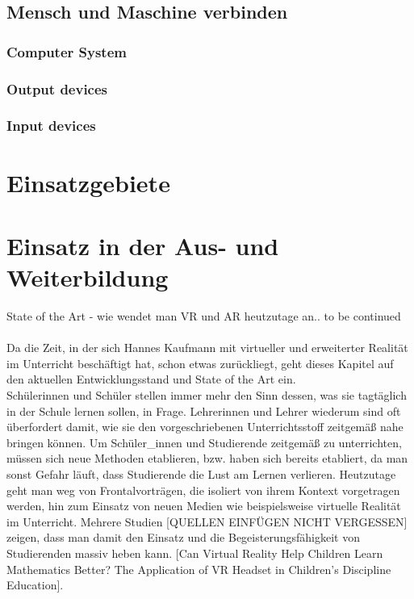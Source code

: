 \documentclass[deutsch]{llncs}
\begin{document}
\subsection{Mensch und Maschine verbinden}

\subsubsection{Computer System}


\subsubsection{Output devices}


\subsubsection{Input devices}


\section{Einsatzgebiete}


\section{Einsatz in der Aus- und Weiterbildung}

State of the Art - wie wendet man VR und AR heutzutage an.. to be continued \\
\noindent \\
Da die Zeit, in der sich Hannes Kaufmann mit virtueller und erweiterter Realität im Unterricht beschäftigt hat, schon etwas zurückliegt, geht dieses Kapitel auf den aktuellen Entwicklungsstand und State of the Art ein. \\
Schülerinnen und Schüler stellen immer mehr den Sinn dessen, was sie tagtäglich in der Schule lernen sollen, in Frage. Lehrerinnen und Lehrer wiederum sind oft überfordert damit, wie sie den vorgeschriebenen Unterrichtsstoff zeitgemäß nahe bringen können. Um Schüler\_innen und Studierende zeitgemäß zu unterrichten, müssen sich neue Methoden etablieren, bzw. haben sich bereits etabliert, da man sonst Gefahr läuft, dass Studierende die Lust am Lernen verlieren. Heutzutage geht man weg von Frontalvorträgen, die isoliert von ihrem Kontext vorgetragen werden, hin zum Einsatz von neuen Medien wie beispielsweise virtuelle Realität im Unterricht. Mehrere Studien [QUELLEN EINFÜGEN NICHT VERGESSEN] zeigen, dass man damit den Einsatz und die Begeisterungsfähigkeit von Studierenden massiv heben kann.
\cite{2}
[Can Virtual Reality Help Children Learn Mathematics Better? The Application of VR Headset in Children’s Discipline Education].
\end{document}
